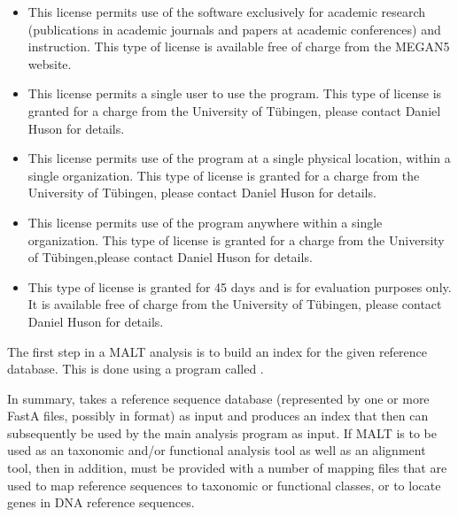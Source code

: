 \documentclass[11pt]{article}
\newcommand\MALT{{\sf MALT}\xspace}
\begin{document}
\begin{itemize}
\item {} This license permits use of the software exclusively for academic research
(publications in academic journals and papers at academic conferences) and instruction.  This type of license is
available free of charge from the MEGAN5 website.
\item   {} This license permits a single user to use the program.
This type of license is granted for a charge from the University of T\"ubingen, please contact Daniel Huson for details.
\item   {} This license permits use of the program at a single physical location, within
  a single organization.
This type of license is granted for a charge from the University of T\"ubingen, please contact Daniel Huson for details.
  \item   {} This license permits use of the program anywhere within
  a single organization.
This type of license is granted for a charge from the University of T\"ubingen,please contact Daniel Huson for details.
\item {} This type of license is  granted for 45 days and is for evaluation purposes only.
   It is available free of charge from the University of T\"ubingen, please contact Daniel Huson for details.
\end{itemize}





The first step in a \MALT analysis is to build an index for the given reference database. This is done
using  a program called .

In summary,  takes a reference sequence database (represented by
one or more FastA files, possibly in  format) as input and produces an index that then can  subsequently be used
by the main analysis program  as input.
If \MALT is to be used as an taxonomic and/or functional analysis tool as well as an alignment tool, then
in addition,   must be provided with a number of mapping files that are used
to map reference sequences to taxonomic or functional classes{, or to locate genes in DNA reference sequences}.
\end{document}
